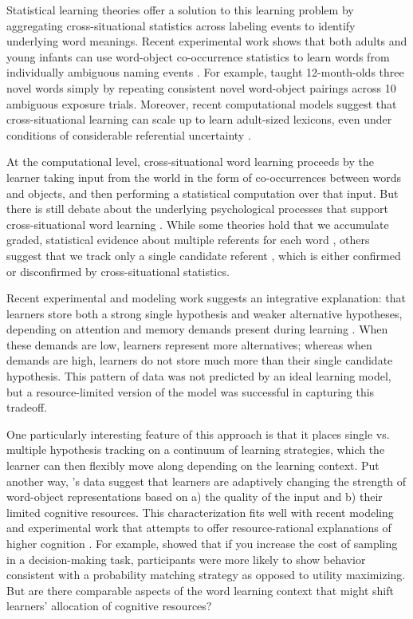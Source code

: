 \documentclass[10pt,letterpaper]{article}
\begin{document}
Statistical learning theories offer a solution to this learning problem by aggregating cross-situational statistics across labeling events to identify underlying word meanings. Recent experimental work shows that both adults and young infants can use word-object co-occurrence statistics to learn words from individually ambiguous naming events \cite{smith2008infants, vouloumanos2008fine}. For example,  taught 12-month-olds three novel words simply by repeating consistent novel word-object pairings across 10 ambiguous exposure trials. Moreover, recent computational models suggest that cross-situational learning can scale up to learn adult-sized lexicons, even under conditions of considerable referential uncertainty \cite{smith2011cross}.

At the computational level, cross-situational word learning proceeds by the learner taking input from the world in the form of co-occurrences between words and objects, and then performing a statistical computation over that input. But there is still debate about the underlying psychological processes that support cross-situational word learning \cite{smith2014unrealized}. While some theories hold that we accumulate graded, statistical evidence about multiple referents for each word \cite{mcmurray2012word}, others suggest that we track only a single candidate referent \cite{trueswell2013propose}, which is either confirmed or disconfirmed by cross-situational statistics.  


Recent experimental and modeling work suggests an integrative explanation: that learners store both a strong single hypothesis and weaker alternative hypotheses, depending on attention and memory demands present during learning \cite{yurovsky2014algorithmic}. When these demands are low, learners represent more alternatives; whereas when demands are high, learners do not store much more than their single candidate hypothesis. This pattern of data was not predicted by an ideal learning model, but a resource-limited version of the model was successful in capturing this tradeoff.

One particularly interesting feature of this approach is that it places single vs. multiple hypothesis tracking on a continuum of learning strategies, which the learner can then flexibly move along depending on the learning context. Put another way, 's data suggest that learners are adaptively changing the strength of word-object representations based on a) the quality of the input and b) their limited cognitive resources. This characterization fits well with recent modeling and experimental work that attempts to offer resource-rational explanations of higher cognition \cite{griffiths2014rational}. For example,  showed that if you increase the cost of sampling in a decision-making task, participants were more likely to show behavior consistent with a probability matching strategy as opposed to utility maximizing. But are there comparable aspects of the word learning context that might shift learners' allocation of cognitive resources?
\end{document}
